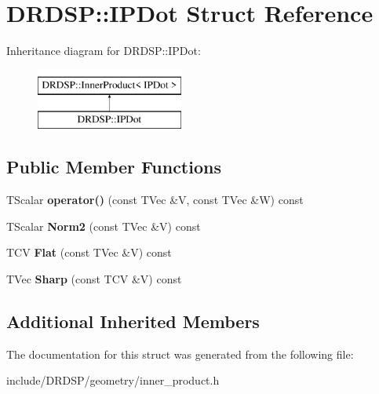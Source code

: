 \hypertarget{struct_d_r_d_s_p_1_1_i_p_dot}{\section{D\-R\-D\-S\-P\-:\-:I\-P\-Dot Struct Reference}
\label{struct_d_r_d_s_p_1_1_i_p_dot}
}
Inheritance diagram for D\-R\-D\-S\-P\-:\-:I\-P\-Dot\-:\begin{figure}[H]
\begin{center}
\leavevmode
\includegraphics[height=2.000000cm]{struct_d_r_d_s_p_1_1_i_p_dot}
\end{center}
\end{figure}
\subsection*{Public Member Functions}
\begin{DoxyCompactItemize}
\item 
\hypertarget{struct_d_r_d_s_p_1_1_i_p_dot_a04fd32a9c8452a39e048bf455bed4704}{T\-Scalar {\bfseries operator()} (const T\-Vec \&V, const T\-Vec \&W) const }\label{struct_d_r_d_s_p_1_1_i_p_dot_a04fd32a9c8452a39e048bf455bed4704}

\item 
\hypertarget{struct_d_r_d_s_p_1_1_i_p_dot_a18e6e71fc6c295234ecd4fe38c3ec0a1}{T\-Scalar {\bfseries Norm2} (const T\-Vec \&V) const }\label{struct_d_r_d_s_p_1_1_i_p_dot_a18e6e71fc6c295234ecd4fe38c3ec0a1}

\item 
\hypertarget{struct_d_r_d_s_p_1_1_i_p_dot_a9401510883e01f0234ed98fae2542504}{T\-C\-V {\bfseries Flat} (const T\-Vec \&V) const }\label{struct_d_r_d_s_p_1_1_i_p_dot_a9401510883e01f0234ed98fae2542504}

\item 
\hypertarget{struct_d_r_d_s_p_1_1_i_p_dot_a2e454edec85353eb6a48eeda553c1a0a}{T\-Vec {\bfseries Sharp} (const T\-C\-V \&V) const }\label{struct_d_r_d_s_p_1_1_i_p_dot_a2e454edec85353eb6a48eeda553c1a0a}

\end{DoxyCompactItemize}
\subsection*{Additional Inherited Members}


The documentation for this struct was generated from the following file\-:\begin{DoxyCompactItemize}
\item 
include/\-D\-R\-D\-S\-P/geometry/inner\-\_\-product.\-h\end{DoxyCompactItemize}
